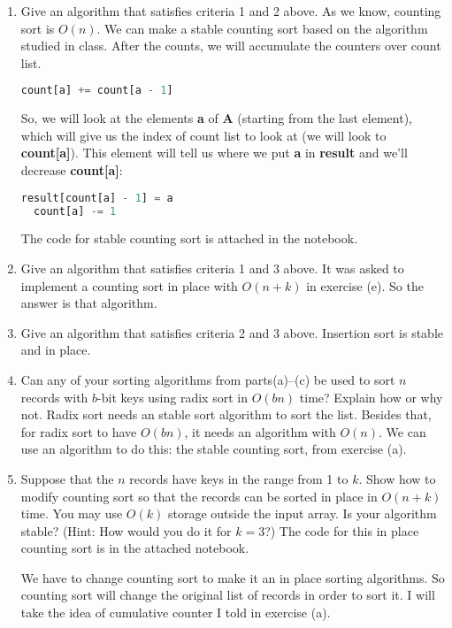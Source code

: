 \documentclass{article}
\begin{document}
\begin{enumerate}[label=(\alph*)]
  \item Give an algorithm that satisfies criteria 1 and 2 above.
  \bigbreak
  As we know, counting sort is $O(n)$. We can make a stable counting sort based on the algorithm studied in class. After the counts, we will accumulate the counters over count list.
  \begin{lstlisting}[language=Python]
  count[a] += count[a - 1]
  \end{lstlisting}
  So, we will look at the elements \textbf{a} of \textbf{A} (starting from the last element), which will give us the index of count list to look at (we will look to \textbf{count[a]}). This element will tell us where we put \textbf{a} in \textbf{result} and we'll decrease \textbf{count[a]}:
  \begin{lstlisting}[language=Python]
  result[count[a] - 1] = a
  count[a] -= 1
  \end{lstlisting}
  The code for stable counting sort is attached in the notebook.
  \bigbreak
  \item Give an algorithm that satisfies criteria 1 and 3 above.
  \bigbreak
  It was asked to implement a counting sort in place with $O(n+k)$ in exercise (e). So the answer is that algorithm.
  \bigbreak
  \item Give an algorithm that satisfies criteria 2 and 3 above.
  \bigbreak
  Insertion sort is stable and in place.
  \bigbreak
  \item Can any of your sorting algorithms from parts(a)–(c) be used to sort $n$ records with $b$-bit keys using radix sort in $O(bn)$ time? Explain how or why not.
  \bigbreak
  Radix sort needs an stable sort algorithm to sort the list. Besides that, for radix sort to have $O(bn)$, it needs an algorithm with $O(n)$. We can use an algorithm to do this: the stable counting sort, from exercise (a).
  \item Suppose that the $n$ records have keys in the range from 1 to $k$. Show how to modify counting sort so that the records can be sorted in place in $O(n + k)$ time. You may use $O(k)$ storage outside the input array. Is your algorithm stable? (Hint: How would you do it for $k = 3$?)
  \bigbreak
  The code for this in place counting sort is in the attached notebook.
  
  We have to change counting sort to make it an in place sorting algorithms. So counting sort will change the original list of records in order to sort it. I will take the idea of cumulative counter I told in exercise (a).
  

\end{enumerate}
\end{document}
